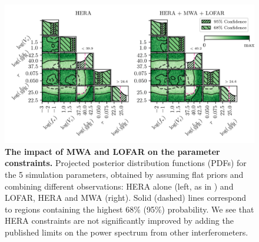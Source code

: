 \begin{figure}
    \centering
    \includegraphics{joint_constraints/figs/other_interferometers.png}
    \caption{\textbf{The impact of MWA and LOFAR on the parameter constraints.} Projected posterior distribution functions (PDFs) for the 5 simulation parameters, obtained by assuming flat priors and combining different observations: HERA alone (left, as in \cite{HERA_2022b}) and LOFAR, HERA and MWA (right). Solid (dashed) lines correspond to regions containing the highest 68\% (95\%) probability. We see that HERA constraints are not significantly improved by adding the published limits on the power spectrum from other interferometers.}
    \label{fig:other_interferometers}
\end{figure}

\clearpage



















